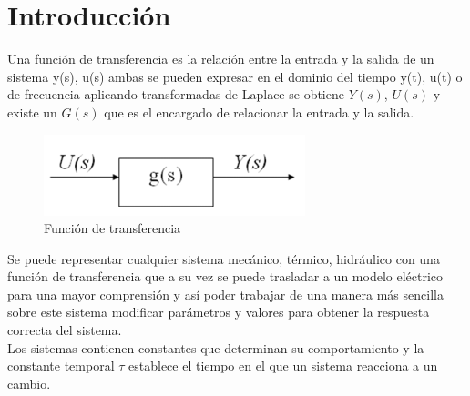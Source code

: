 \documentclass[letterpaper,11pt]{article}
\begin{document}
	\thispagestyle{empty}
	
	\thispagestyle{plain}
	\section{Introducción}
	Una función de transferencia es la relación entre la entrada y la salida de un sistema y(s), u(s) ambas se pueden expresar en el dominio del tiempo y(t), u(t)  o de frecuencia aplicando transformadas de Laplace se obtiene $Y(s)$, $U(s)$ y existe un $G(s)$ que es el encargado de relacionar la entrada y la salida.
	\begin{figure}[h!]
\centering
\includegraphics[scale=1]{screenshot001}
\caption{Función de transferencia}
\label{fig:screenshot001}
\end{figure}

	Se puede representar cualquier sistema mecánico, térmico, hidráulico con una función de transferencia que a su vez se puede trasladar a un modelo eléctrico para una mayor comprensión y así poder trabajar de una manera más sencilla sobre este sistema modificar parámetros y valores para obtener la respuesta correcta del sistema.\\
	Los sistemas contienen constantes que determinan su comportamiento y la constante temporal $\tau$ establece el tiempo en el que un sistema reacciona a un cambio.
\end{document}
